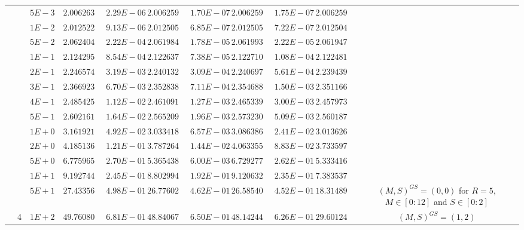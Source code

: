 \begin{landscape}
\begin{table}[ht]
{\begin{tabular}[c]{c|c|c|c|c|c|c|c|c|c|c}
& &$5E-3$ & $2.006263945539$ & $2.29E-06$ & $2.006259689492$ & $1.70E-07$ & $2.006259698750$ & $1.75E-07$ & $2.006259347655$ &  \\
& &$1E-2$ & $2.012522647963$ & $9.13E-06$ & $2.012505647870$ & $6.85E-07$ & $2.012505721857$ & $7.22E-07$ & $2.012504269056$ &  \\
& &$5E-2$ & $2.062404808005$ & $2.22E-04$ & $2.061984602154$ & $1.78E-05$ & $2.061993767625$ & $2.22E-05$ & $2.061947942318$ &  \\
& &$1E-1$ & $2.124295000418$ & $8.54E-04$ & $2.122637920311$ & $7.38E-05$ & $2.122710367477$ & $1.08E-04$ & $2.122481353547$ &  \\
& &$2E-1$ & $2.246574506683$ & $3.19E-03$ & $2.240132733855$ & $3.09E-04$ & $2.240697184146$ & $5.61E-04$ & $2.239439975058$ &  \\
& &$3E-1$ & $2.366923700288$ & $6.70E-03$ & $2.352838529008$ & $7.11E-04$ & $2.354688569748$ & $1.50E-03$ & $2.351166061395$ &  \\
& &$4E-1$ & $2.485425861700$ & $1.12E-02$ & $2.461091716210$ & $1.27E-03$ & $2.465339980045$ & $3.00E-03$ & $2.457973187497$ &  \\
& &$5E-1$ & $2.602161579782$ & $1.64E-02$ & $2.565209233355$ & $1.96E-03$ & $2.573230325859$ & $5.09E-03$ & $2.560187735597$ &  \\
& &$1E+0$ & $3.161921401726$ & $4.92E-02$ & $3.033418457765$ & $6.57E-03$ & $3.086386629747$ & $2.41E-02$ & $3.013626129397$ &  \\
& &$2E+0$ & $4.185136950885$ & $1.21E-01$ & $3.787264741771$ & $1.44E-02$ & $4.063355183669$ & $8.83E-02$ & $3.733597603174$ &  \\
& &$5E+0$ & $6.775965715485$ & $2.70E-01$ & $5.365438495287$ & $6.00E-03$ & $6.729277440105$ & $2.62E-01$ & $5.333416434792$ &  \\
& &$1E+1$ & $9.192744506771$ & $2.45E-01$ & $8.802994301904$ & $1.92E-01$ & $9.120632575845$ & $2.35E-01$ & $7.383537264058$ &  \\
& &$5E+1$ & $27.433561900391$ & $4.98E-01$ & $26.776022625443$ & $4.62E-01$ & $26.585406735688$ & $4.52E-01$ & $18.314898304163$ & \multirow{-22}{3cm}{$(M,S)^{GS}=(0,0)$ for $R=5$, $M\in[0:12]$ and $S\in[0:2]$}  \\ \cline{10-11}
& \multirow{-23}{*}{4} &$1E+2$ & $49.760800203239$ & $6.81E-01$ & $48.840671584843$ & $6.50E-01$ & $48.142443831938$ & $6.26E-01$ & $29.601244919262$ & \multirow{-1}{3cm}{$(M,S)^{GS}=(1,2)$} \\ \cline{2-11}


\end{tabular}}
\end{table}
\end{landscape}
